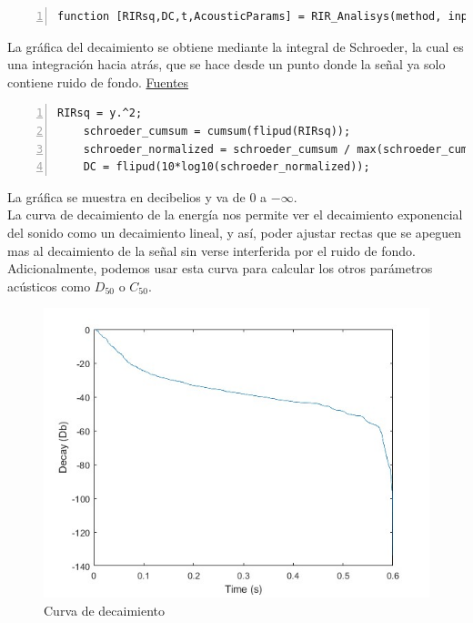 \begin{lstlisting}[frame=single,numbers=left, style=Matlab-editor, basicstyle=\tiny]
function [RIRsq,DC,t,AcousticParams] = RIR_Analisys(method, input, room_dimensions,printFlag)
\end{lstlisting}
La gráfica del decaimiento se obtiene mediante la integral de Schroeder, la cual es una integración hacia atrás, que se hace desde un punto donde la señal ya solo contiene ruido de fondo. \href{https://www.roomeqwizard.com/help/help_en-GB/html/graph_filteredir.html}{Fuentes}
\begin{lstlisting}[frame=single,numbers=left, style=Matlab-editor, basicstyle=\tiny]
    RIRsq = y.^2;
    schroeder_cumsum = cumsum(flipud(RIRsq));
    schroeder_normalized = schroeder_cumsum / max(schroeder_cumsum);
    DC = flipud(10*log10(schroeder_normalized));
\end{lstlisting}
La gráfica se muestra en decibelios y va de 0 a $-\infty$. \\
La curva de decaimiento de la energía nos permite ver el decaimiento exponencial del sonido como un decaimiento lineal, y así, poder ajustar rectas que se apeguen mas al decaimiento de la señal sin verse interferida por el ruido de fondo. Adicionalmente, podemos usar esta curva para calcular los otros parámetros acústicos como $D_{50}$ o $C_{50}$.\hfill\break
\begin{figure}[!htb]
    \centering
    \includegraphics[width=\linewidth]{imagenes/DecayCurve_RIR_Analysis.jpg}
    \caption{\footnotesize Curva de decaimiento}
    \label{fig:DecayCurve}
\end{figure}
\FloatBarrier
